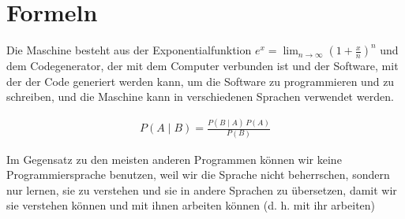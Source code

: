 \section{Formeln}

Die Maschine besteht aus der Exponentialfunktion 
$e^x = \lim_{n \to \infty} \left( 1+ \frac{x}{n} \right)^n$ 
und dem Codegenerator, der mit dem Computer verbunden 
ist und der Software, mit der der Code generiert werden kann, 
um die Software zu programmieren und zu schreiben, und die 
Maschine kann in verschiedenen Sprachen verwendet werden.

\begin{align}
\label{bayes}
    P(A \mid B) = \frac{P(B \mid A) \, P(A)}{P(B)}
\end{align}

Im Gegensatz zu den meisten anderen Programmen können wir keine Programmiersprache benutzen, weil wir die Sprache nicht beherrschen, sondern nur lernen, sie zu verstehen und sie in andere Sprachen zu übersetzen, damit wir sie verstehen können und mit ihnen arbeiten können (d. h. mit ihr arbeiten)
